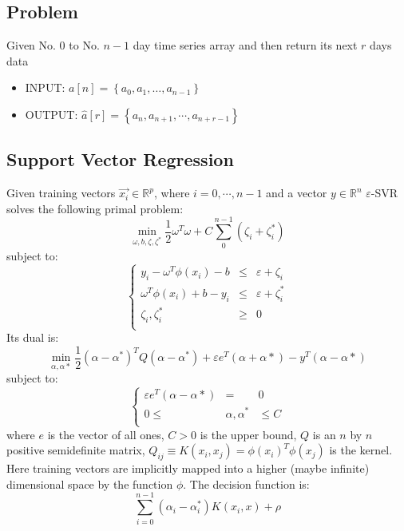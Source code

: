 \documentclass[a0,portrait]{a0poster}
\begin{document}
\begin{multicols}{3}
\subsection*{Problem}
Given No. $0$ to No. $n - 1$ day time series array and then return its next $r$ days data
\begin{itemize}
\item INPUT: $a\left[n\right] = \left\{a_0, a_1, …, a_{n - 1}\right\}$
\item OUTPUT: $\hat{a}\left[r\right] = \left\{a_{n}, a_{n + 1}, \cdots, a_{n + r - 1}\right\}$
\end{itemize}
\subsection*{Support Vector Regression}
Given training vectors $\vec{x_i} \in \mathbb{R}^p$, where $i = 0, \cdots, n - 1$ and a vector $y \in \mathbb{R}^n$ $\varepsilon$-SVR solves the following primal problem:
\begin{equation}
\min\limits_{\omega, b, \zeta, \zeta^*}\dfrac{1}{2}\omega^T\omega + C \sum \limits_{0}^{n - 1}{\left(\zeta_i + \zeta_i^*\right)}
\end{equation}
subject to:
\begin{equation}
\left\{
\begin{array}{rcl}
y_i - \omega^T\phi\left(x_i\right) - b & \le & \varepsilon + \zeta_i\\
\omega^T\phi\left(x_i\right) + b - y_i & \le & \varepsilon + \zeta_i^*\\
\zeta_i, \zeta_i^* & \ge & 0\\
\end{array}
\right.
\end{equation}
Its dual is:
\begin{equation}
\min\limits_{\alpha, \alpha*}\dfrac{1}{2}\left(\alpha - \alpha^*\right)^T Q\left(\alpha - \alpha^*\right) + \varepsilon e^T \left(\alpha + \alpha*\right) - y ^ T \left(\alpha - \alpha*\right)
\end{equation}
subject to:
\begin{equation}
\left\{
\begin{array}{rcl}
\varepsilon e^T \left(\alpha - \alpha*\right) & = & 0\\
0 \le & \alpha, \alpha^* & \le C\\
\end{array}
\right.
\end{equation}
where $e$ is the vector of all ones, $C > 0$ is the upper bound, $Q$ is an $n$ by $n$ positive semidefinite matrix,
$Q_{ij} \equiv K\left(x_i, x_j\right) = \phi \left(x_i\right)^T \phi \left(x_j\right)$ is the kernel. Here training vectors are implicitly mapped into a higher (maybe infinite) dimensional space by the function $\phi$.
The decision function is:
\begin{equation}
\sum_{i=0}^{n-1} \left(\alpha_i - \alpha_i^*\right) K\left(x_i, x\right) + \rho
\end{equation}

\end{multicols}
\end{document}
